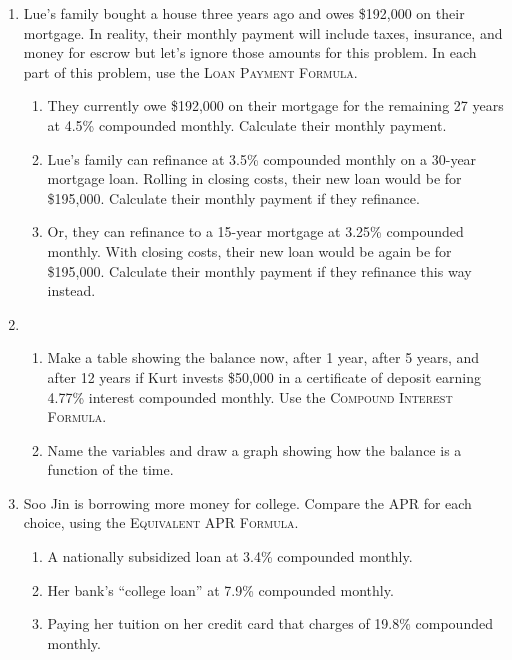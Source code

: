 \begin{enumerate}
\item Lue's family bought a house three years ago and owes \$192,000 on their mortgage.  In reality, their monthly payment will include taxes, insurance, and money for escrow but let's ignore those amounts for this problem. In each part of this problem, use the \textsc{Loan Payment Formula}. 
\begin{enumerate}
\item They currently owe \$192,000 on their mortgage for the remaining 27 years at 4.5\% compounded monthly.  Calculate their monthly payment. 
\item Lue's family can refinance at 3.5\% compounded monthly on a 30-year mortgage loan.  Rolling in closing costs, their new loan would be for \$195,000.  Calculate their monthly payment if they refinance.
\item Or, they can refinance to a 15-year mortgage at 3.25\% compounded monthly.  With closing costs, their new loan would be again be for \$195,000.  Calculate their monthly payment if they refinance this way instead.
\end{enumerate}

\item \begin{enumerate}
\item Make a table showing the balance now, after 1 year, after 5 years, and after 12 years if Kurt invests \$50,000 in a certificate of deposit earning 4.77\% interest compounded monthly. Use the \textsc{Compound Interest Formula}.
\item Name the variables and draw a graph showing how the balance is a function of the time.  
\end{enumerate}

\item Soo Jin is borrowing more money for college. Compare the APR for each choice, using the \textsc{Equivalent APR Formula}.
\begin{enumerate}
\item A nationally subsidized loan at 3.4\% compounded monthly.
\item Her bank's ``college loan'' at 7.9\% compounded monthly.
\item Paying her tuition on her credit card that charges of 19.8\% compounded monthly.
\end{enumerate}

\end{enumerate}
